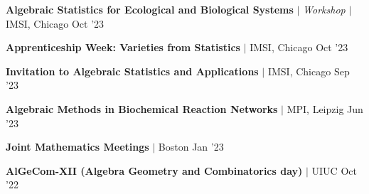 \resumeProjectHeading
{\textbf{Algebraic Statistics for Ecological and Biological Systems} $|$ \textit{Workshop}  $|$ IMSI, Chicago}
{Oct '23}
{}
\vspace{\mygap}

\resumeProjectHeading
{\textbf{Apprenticeship Week: Varieties from Statistics} $|$ IMSI, Chicago}
{{Oct '23}}
{}
\vspace{\mygap}

\resumeProjectHeading
{\textbf{Invitation to Algebraic Statistics and Applications}   $|$ IMSI, Chicago}
{{Sep '23}}
{}
\vspace{\mygap}

\resumeProjectHeading
{\textbf{Algebraic Methods in Biochemical Reaction Networks}  $|$ MPI, Leipzig}
{{Jun '23}}
{}
\vspace{\mygap}


\resumeProjectHeading
{\textbf{Joint Mathematics Meetings}   $|$ Boston }
{Jan '23}
{}
\vspace{\mygap}

\resumeProjectHeading
{\textbf{AlGeCom-XII (Algebra Geometry and Combinatorics day)}  $|$ UIUC}
{Oct '22}
{}
\vspace{\gap}




\resumeSubHeadingListEnd




